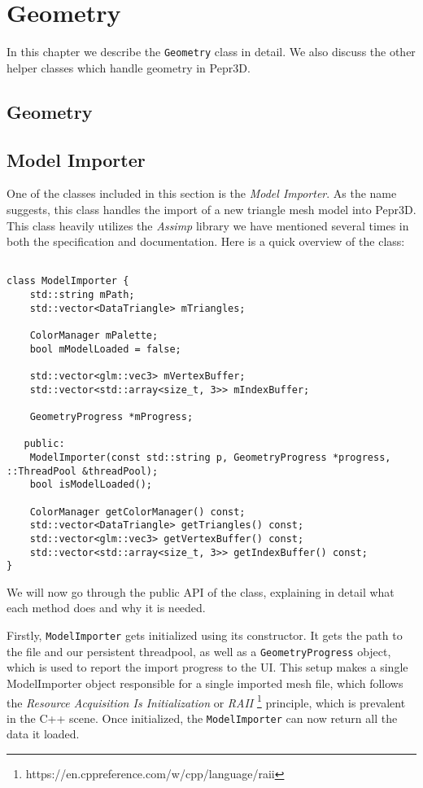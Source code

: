 \chapter{Geometry}

In this chapter we describe the \texttt{Geometry} class in detail. We also discuss the other helper classes which handle geometry in Pepr3D.

\label{chap:geom}

\section{Geometry}

\section{Model Importer}

One of the classes included in this section is the \textit{Model Importer}. As the name suggests, this class handles the import of a new triangle mesh model into Pepr3D. This class heavily utilizes the \textit{Assimp} library we have mentioned several times in both the specification and documentation. Here is a quick overview of the class:

\begin{lstlisting}

class ModelImporter {
    std::string mPath;
    std::vector<DataTriangle> mTriangles;

    ColorManager mPalette;
    bool mModelLoaded = false;

    std::vector<glm::vec3> mVertexBuffer;
    std::vector<std::array<size_t, 3>> mIndexBuffer;

    GeometryProgress *mProgress;

   public:
    ModelImporter(const std::string p, GeometryProgress *progress, ::ThreadPool &threadPool);
    bool isModelLoaded();

    ColorManager getColorManager() const;
    std::vector<DataTriangle> getTriangles() const;
    std::vector<glm::vec3> getVertexBuffer() const;
    std::vector<std::array<size_t, 3>> getIndexBuffer() const;
}

\end{lstlisting}

We will now go through the public API of the class, explaining in detail what each method does and why it is needed.

Firstly, \texttt{ModelImporter} gets initialized using its constructor. It gets the path to the file and our persistent threadpool, as well as a \texttt{GeometryProgress} object, which is used to report the import progress to the UI. This setup makes a single ModelImporter object responsible for a single imported mesh file, which follows the \textit{Resource Acquisition Is Initialization} or \textit{RAII} \footnote{https://en.cppreference.com/w/cpp/language/raii} principle, which is prevalent in the C++ scene. Once initialized, the \texttt{ModelImporter} can now return all the data it loaded.

